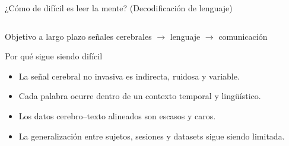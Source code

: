 \documentclass[aspectratio=169,10pt]{beamer}
\newcommand{\bigmetric}[2]{{\huge\bfseries\color{deepgreen}{#1}\par}\vspace{0.8mm}{\scriptsize #2\par}\vspace{3mm}}
\begin{document}
\begin{frame}[c]{¿Cómo de difícil es leer la mente? (Decodificación de lenguaje)}
  \begin{columns}[c,totalwidth=\linewidth]
    \begin{column}{0.58\linewidth}
      \begin{block}{Objetivo a largo plazo}
        \centering
        \Large señales cerebrales $\rightarrow$ lenguaje $\rightarrow$ comunicación
      \end{block}

      \vspace{2mm}

      \begin{block}{Por qué sigue siendo difícil}
        \begin{itemize}
          \item La señal cerebral no invasiva es indirecta, ruidosa y variable.
          \item Cada palabra ocurre dentro de un contexto temporal y lingüístico.
          \item Los datos cerebro--texto alineados son escasos y caros.
          \item La generalización entre sujetos, sesiones y datasets sigue siendo limitada.
        \end{itemize}
      \end{block}
    \end{column}

    \begin{column}{0.38\linewidth}
      \centering
      \bigmetric{BCI}{interfaz cerebro--ordenador}
      \bigmetric{B2T}{brain-to-text}
      \bigmetric{reto}{pasar de señales ruidosas a palabras}
    \end{column}
  \end{columns}

\end{frame}

\end{document}
